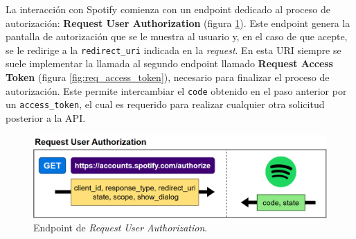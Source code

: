La interacción con Spotify comienza con un endpoint dedicado al proceso de autorización: \textbf{Request User Authorization} (figura \ref{fig:req_usr_auth}). Este endpoint genera la pantalla de autorización que se le muestra al usuario y, en el caso de que acepte, se le redirige a la \texttt{redirect\_uri} indicada en la \textit{request}. En esta URI siempre se suele implementar la llamada al segundo endpoint llamado \textbf{Request Access Token} (figura \ref{fig:req_access_token}), necesario para finalizar el proceso de autorización. Este permite intercambiar el \texttt{code} obtenido en el paso anterior por un \texttt{access\_token}, el cual es requerido para realizar cualquier otra solicitud posterior a la API.

\begin{figure}[H]
    \centering
    \includegraphics[width=\textwidth]{figures/endpoints/request_user_auth.png}
    \caption{Endpoint de \textit{Request User Authorization}.}
    \label{fig:req_usr_auth}
\end{figure}

